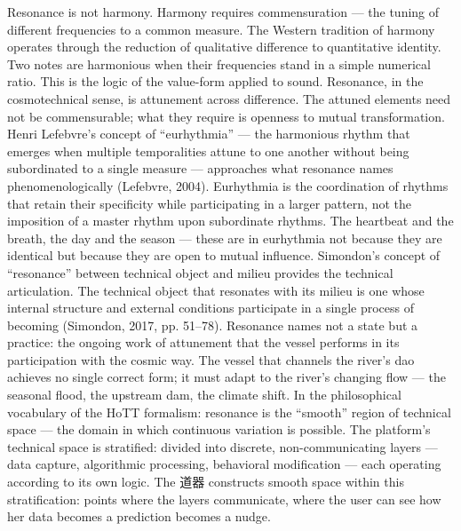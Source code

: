 Resonance is not harmony. Harmony requires commensuration — the tuning of different frequencies to a common measure. The Western tradition of harmony operates through the reduction of qualitative difference to quantitative identity. Two notes are harmonious when their frequencies stand in a simple numerical ratio. This is the logic of the value-form applied to sound. Resonance, in the cosmotechnical sense, is attunement across difference. The attuned elements need not be commensurable; what they require is openness to mutual transformation. Henri Lefebvre’s concept of “eurhythmia” — the harmonious rhythm that emerges when multiple temporalities attune to one another without being subordinated to a single measure — approaches what resonance names phenomenologically (Lefebvre, 2004). Eurhythmia is the coordination of rhythms that retain their specificity while participating in a larger pattern, not the imposition of a master rhythm upon subordinate rhythms. The heartbeat and the breath, the day and the season — these are in eurhythmia not because they are identical but because they are open to mutual influence. Simondon’s concept of “resonance” between technical object and milieu provides the technical articulation. The technical object that resonates with its milieu is one whose internal structure and external conditions participate in a single process of becoming (Simondon, 2017, pp. 51–78). Resonance names not a state but a practice: the ongoing work of attunement that the vessel performs in its participation with the cosmic way. The vessel that channels the river’s dao achieves no single correct form; it must adapt to the river’s changing flow — the seasonal flood, the upstream dam, the climate shift. In the philosophical vocabulary of the HoTT formalism: resonance is the “smooth” region of technical space — the domain in which continuous variation is possible. The platform’s technical space is stratified: divided into discrete, non-communicating layers — data capture, algorithmic processing, behavioral modification — each operating according to its own logic. The 道器 constructs smooth space within this stratification: points where the layers communicate, where the user can see how her data becomes a prediction becomes a nudge.

